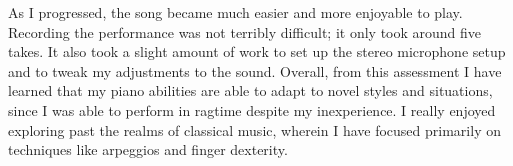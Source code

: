 \documentclass[11pt,a4paper]{article}
\begin{document}
As I progressed, the song became much easier and more enjoyable to play. Recording the performance was not terribly difficult; it only took around five takes. It also took a slight amount of work to set up the stereo microphone setup and to tweak my adjustments to the sound. Overall, from this assessment I have learned that my piano abilities are able to adapt to novel styles and situations, since I was able to perform in ragtime despite my inexperience. I really enjoyed exploring past the realms of classical music, wherein I have focused primarily on techniques like arpeggios and finger dexterity.


\printbibliography
\end{document}

